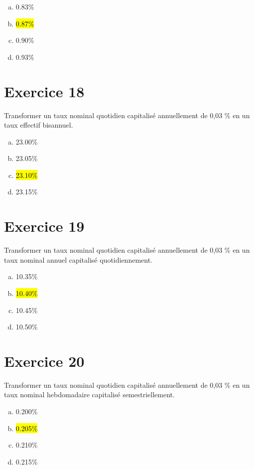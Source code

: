 \documentclass[10pt,a4paper]{article}
\begin{document}
\begin{enumerate}[a)]
\item 0.83\%
\item \hl{0.87\%}
\item 0.90\%
\item 0.93\%
\end{enumerate}


\section*{Exercice 18}
Transformer un taux nominal quotidien capitalisé annuellement de 0,03 \% en un taux effectif bisannuel.



\begin{enumerate}[a)]
\item 23.00\%
\item 23.05\%
\item \hl{23.10\%}
\item 23.15\%
\end{enumerate}


\section*{Exercice 19}
Transformer un taux nominal quotidien capitalisé annuellement de 0,03 \% en un taux nominal annuel capitalisé quotidiennement.



\begin{enumerate}[a)]
\item 10.35\%
\item \hl{10.40\%}
\item 10.45\%
\item 10.50\%
\end{enumerate}


\section*{Exercice 20}
Transformer un taux nominal quotidien capitalisé annuellement de 0,03 \% en un taux nominal hebdomadaire capitalisé semestriellement.



\begin{enumerate}[a)]
\item 0.200\%
\item \hl{0.205\%}
\item 0.210\%
\item 0.215\%
\end{enumerate}
\end{document}
